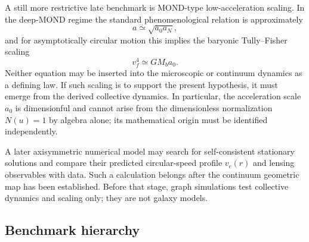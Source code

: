 \documentclass[11pt,a4paper]{article}
\theoremstyle{remark}
\begin{document}
A still more restrictive late benchmark is MOND-type low-acceleration scaling.  In the deep-MOND regime the standard phenomenological relation is approximately \cite{Milgrom1983}
\begin{equation}
  a\simeq\sqrt{a_0a_N},
\tag{6.2}\label{eq:deep-mond-benchmark}
\end{equation}
and for asymptotically circular motion this implies the baryonic Tully--Fisher scaling \cite{McGaugh2000}
\begin{equation}
  v_f^4\simeq G M_b a_0.
\tag{6.3}\label{eq:btfr-benchmark}
\end{equation}
Neither equation may be inserted into the microscopic or continuum dynamics as a defining law.  If such scaling is to support the present hypothesis, it must emerge from the derived collective dynamics.  In particular, the acceleration scale \(a_0\) is dimensionful and cannot arise from the dimensionless normalization \(N(u)=1\) by algebra alone; its mathematical origin must be identified independently.

A later axisymmetric numerical model may search for self-consistent stationary solutions and compare their predicted circular-speed profile \(v_c(r)\) and lensing observables with data.  Such a calculation belongs after the continuum geometric map has been established.  Before that stage, graph simulations test collective dynamics and scaling only; they are not galaxy models.

\subsection{Benchmark hierarchy}
\end{document}

